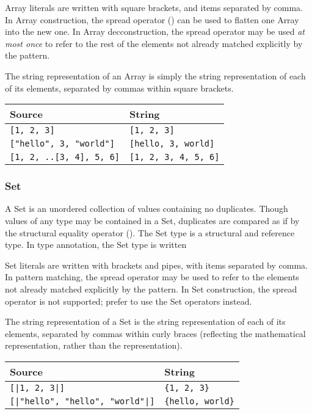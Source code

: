 Array literals are written with square brackets, and items separated by
comma. In Array construction, the spread operator () can be used
to flatten one Array into the new one. In Array decconstruction, the spread
operator may be used \emph{at most once} to refer to the rest of the elements
not already matched explicitly by the pattern.

The string representation of an Array is simply the string representation of
each of its elements, separated by commas within square brackets.

\begin{table}[H]
    \centering
    \begin{tabular}{ll}
        \hline
        \textbf{Source} & \textbf{String} \\
        \hline
        \texttt{[1, 2, 3]} & \texttt{[1, 2, 3]} \\
        \texttt{["hello", 3, "world"]} & \texttt{[hello, 3, world]} \\
        \texttt{[1, 2, ..[3, 4], 5, 6]} & \texttt{[1, 2, 3, 4, 5, 6]} \\
        \hline
    \end{tabular}
\end{table}

\subsubsection{Set}

A Set is an unordered collection of values containing no duplicates. Though
values of any type may be contained in a Set, duplicates are compared as if
by the structural equality operator (). The Set type is a structural
and reference type. In type annotation, the Set type is written 

Set literals are written with brackets and pipes, with items separated by comma.
In pattern matching, the spread operator may be used to refer to the elements
not already matched explicitly by the pattern. In Set construction, the
spread operator is not supported; prefer to use the Set operators instead.

The string representation of a Set is the string representation of
each of its elements, separated by commas within curly braces (reflecting the
mathematical representation, rather than the \Trilogy{} representation).

\begin{table}[H]
    \centering
    \begin{tabular}{ll}
        \hline
        \textbf{Source} & \textbf{String} \\
        \hline
        \texttt{[|1, 2, 3|]} & \texttt{\{1, 2, 3\}} \\
        \texttt{[|"hello", "hello", "world"|]} & \texttt{\{hello, world\}} \\
        \hline
    \end{tabular}
\end{table}

